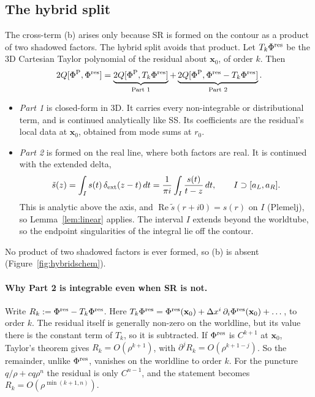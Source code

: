 \documentclass[11pt,a4paper]{article}
\renewcommand{\Re}{\operatorname{Re}}
\newcommand{\dext}{\delta_{\rm ext}}
\newcommand{\x}{\mathbf{x}}
\begin{document}
\subsection{The hybrid split}\label{sec:hybrid}
The cross-term (b) arises only because SR is formed on the contour as a product of two shadowed factors.
The hybrid split avoids that product.
Let $T_k\Phi^{\rm res}$ be the 3D Cartesian Taylor polynomial of the residual about $\x_0$, of order $k$. Then
\begin{equation}
2Q[\Phi^{\rm P},\Phi^{\rm res}]
=\underbrace{2Q[\Phi^{\rm P},T_k\Phi^{\rm res}]}_{\text{Part 1}}
+\underbrace{2Q[\Phi^{\rm P},\Phi^{\rm res}-T_k\Phi^{\rm res}]}_{\text{Part 2}}.
\end{equation}
\begin{itemize}[nosep]
\item \emph{Part 1} is closed-form in 3D. It carries every non-integrable or distributional term, and is continued analytically like SS.
  Its coefficients are the residual's local data at $\x_0$, obtained from mode sums at $r_0$.
\item \emph{Part 2} is formed on the real line, where both factors are real.
  It is continued with the extended delta,
  \begin{equation}
  \tilde s(z)=\int_I s(t)\,\dext(z-t)\,dt=\frac{1}{\pi i}\int_I\frac{s(t)}{t-z}\,dt,\qquad I\supset[a_L,a_R].
  \end{equation}
  This is analytic above the axis, and $\Re\tilde s(r+i0)=s(r)$ on $I$ (Plemelj), so Lemma~\ref{lem:linear} applies.
  The interval $I$ extends beyond the worldtube, so the endpoint singularities of the integral lie off the contour.
\end{itemize}
No product of two shadowed factors is ever formed, so (b) is absent (Figure~\ref{fig:hybridschem}).

\paragraph{Why Part 2 is integrable even when SR is not.}
Write $R_k:=\Phi^{\rm res}-T_k\Phi^{\rm res}$.
Here $T_k\Phi^{\rm res}=\Phi^{\rm res}(\x_0)+\Delta x^i\,\partial_i\Phi^{\rm res}(\x_0)+\dots$, to order $k$.
The residual itself is generally non-zero on the worldline, but its value there is the constant term of $T_k$, so it is subtracted.
If $\Phi^{\rm res}$ is $C^{k+1}$ at $\x_0$, Taylor's theorem gives $R_k=O(\rho^{k+1})$, with $\partial^jR_k=O(\rho^{k+1-j})$.
So the remainder, unlike $\Phi^{\rm res}$, vanishes on the worldline to order $k$.
For the puncture $q/\rho+cq\rho^n$ the residual is only $C^{n-1}$, and the statement becomes $R_k=O(\rho^{\min(k+1,n)})$.
\end{document}
